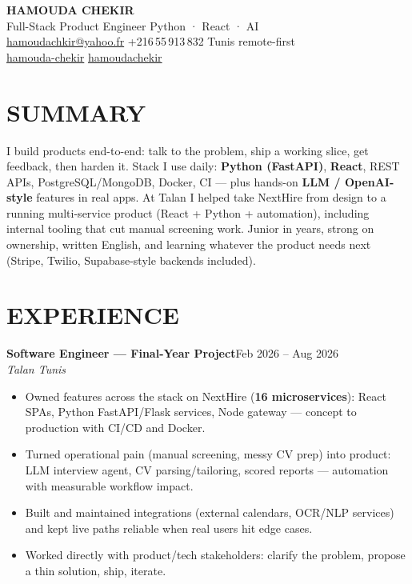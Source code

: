\documentclass[10pt,a4paper]{article}
\newcommand{\TargetTitle}{Full-Stack Product Engineer \textbar{} Python · React · AI}
\newcommand{\job}[3]{%
  \textbf{\color{primary}#1}\hfill{\color{muted}\small #2}\\[-1pt]
  {\color{accent}\textit{#3}}\\[2pt]
  \begin{itemize}[leftmargin=0.85em, itemsep=1pt, topsep=0pt, parsep=0pt, partopsep=0pt]
}
\newcommand{\contactsep}{\hspace{5pt}{\color{rulecolor}|}\hspace{5pt}}
\begin{document}
{\fontsize{22}{26}\selectfont\bfseries\color{primary}HAMOUDA CHEKIR}\\[2pt]
{\large\color{accent}\TargetTitle}\\[4pt]
{\footnotesize\color{muted}%
  \hspace{3pt}\href{mailto:hamoudachkir@yahoo.fr}{hamoudachkir@yahoo.fr}%
  \contactsep
  \hspace{3pt}+216\,55\,913\,832%
  \contactsep
  \hspace{3pt}Tunis \textbar{} remote-first%
}\\[2pt]
{\footnotesize\color{muted}%
  \hspace{3pt}\href{https://www.linkedin.com/in/hamouda-chekir-5053572b4}{hamouda-chekir}%
  \contactsep
  \hspace{3pt}\href{https://github.com/hamoudachekir}{hamoudachekir}%
}\\[6pt]

\section{SUMMARY}
I build products end-to-end: talk to the problem, ship a working slice, get feedback, then harden it.
Stack I use daily: \textbf{Python (FastAPI)}, \textbf{React}, REST APIs, PostgreSQL/MongoDB, Docker, CI --- plus hands-on \textbf{LLM / OpenAI-style} features in real apps.
At Talan I helped take NextHire from design to a running multi-service product (React + Python + automation), including internal tooling that cut manual screening work.
Junior in years, strong on ownership, written English, and learning whatever the product needs next (Stripe, Twilio, Supabase-style backends included).

\section{EXPERIENCE}

\job{Software Engineer --- Final-Year Project}{Feb 2026 -- Aug 2026}{Talan \textbar{} Tunis}
  \item Owned features across the stack on NextHire (\textbf{16 microservices}): React SPAs, Python FastAPI/Flask services, Node gateway --- concept to production with CI/CD and Docker.
  \item Turned operational pain (manual screening, messy CV prep) into product: LLM interview agent, CV parsing/tailoring, scored reports --- automation with measurable workflow impact.
  \item Built and maintained integrations (external calendars, OCR/NLP services) and kept live paths reliable when real users hit edge cases.
  \item Worked directly with product/tech stakeholders: clarify the problem, propose a thin solution, ship, iterate.
\end{itemize}
\end{document}
